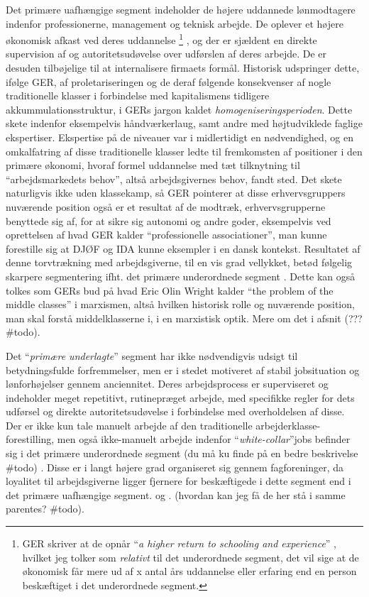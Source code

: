 Det primære uafhængige segment \label{GER kontrol og intern arb marked} indeholder de højere uddannede lønmodtagere indenfor professionerne, management og teknisk arbejde. De oplever et højere økonomisk afkast ved deres uddannelse%
% 
\footnote{GER skriver at de opnår “\emph{a higher return to schooling and experience}” \parencite[202]{Gordon1982}, hvilket jeg tolker som \emph{relativt} til det underordnede segment, det vil sige at de økonomisk får mere ud af x antal års uddannelse eller erfaring end en person beskæftiget i det underordnede segment.}%
%
, og der er sjældent en direkte supervision af og autoritetsudøvelse over udførslen af deres arbejde. De er desuden tilbøjelige til at internalisere firmaets formål. 
Historisk udspringer dette, ifølge GER, af proletariseringen og de deraf følgende konsekvenser af nogle traditionelle klasser i forbindelse med kapitalismens tidligere akkummulationsstruktur, i GERs jargon kaldet \emph{homogeniseringsperioden}.  Dette skete indenfor eksempelvis håndværkerlaug, samt andre med højtudviklede faglige ekspertiser. Ekspertise på de niveauer var i midlertidigt en nødvendighed, og en omkalfatring af disse traditionelle klasser ledte til fremkomsten af positioner i den primære økonomi, hvoraf formel uddannelse med tæt tilknytning til “arbejdsmarkedets behov”, altså arbejdsgivernes behov, fandt sted. Det skete naturligvis ikke uden klassekamp, så GER pointerer at disse erhvervsgruppers nuværende position også er et resultat af de modtræk, erhvervsgrupperne benyttede sig af, for at sikre sig autonomi og andre goder, eksempelvis ved oprettelsen af hvad GER kalder “professionelle associationer”, man kunne forestille sig at DJØF og IDA kunne eksempler i en dansk kontekst. Resultatet af denne torvtrækning med arbejdsgiverne, til en vis grad vellykket, betød følgelig skarpere segmentering ifht. det primære underordnede segment \parencite[202f]{Gordon1982}.
Dette kan også tolkes som GERs bud på hvad Eric Olin Wright kalder “the problem of the middle classes” i marxismen, altså hvilken historisk rolle og nuværende position, man skal forstå middelklasserne i, i en marxistisk optik. Mere om det i afsnit (??? \#todo).

Det “\emph{primære underlagte}” segment har ikke nødvendigvis udsigt til betydningsfulde forfremmelser, men er i stedet motiveret af stabil jobsituation og lønforhøjelser gennem anciennitet. Deres arbejdsprocess er superviseret og indeholder meget repetitivt, rutinepræget arbejde, med specifikke regler for dets udførsel og direkte autoritetsudøvelse i forbindelse med overholdelsen af disse. Der er ikke kun tale manuelt arbejde af den traditionelle arbejderklasse-forestilling, men også ikke-manuelt arbejde indenfor “\emph{white-collar}”jobs befinder sig i det primære underordnede segment (du må ku finde på en bedre beskrivelse \#todo) .  Disse er i langt højere grad organiseret sig gennem fagforeninger, da loyalitet til arbejdsgiverne ligger fjernere for beskæftigede i dette segment end i det primære uafhængige segment. \parencite[28f]{Drago1995} og \parencite[203]{Gordon1982}. (hvordan kan jeg få de her stå i samme parentes? \#todo).



